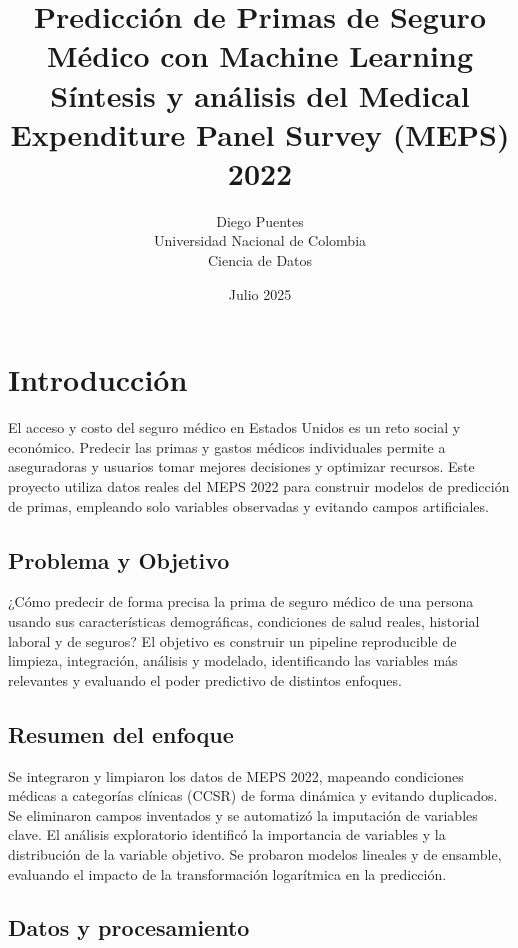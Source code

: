 \documentclass[12pt,a4paper]{article}
\title{
\textbf{Predicción de Primas de Seguro Médico con Machine Learning}\\
\large{Síntesis y análisis del Medical Expenditure Panel Survey (MEPS) 2022}
}
\author{
Diego Puentes\\
Universidad Nacional de Colombia\\
Ciencia de Datos
}
\date{Julio 2025}
\begin{document}
\maketitle

\newpage

\tableofcontents

\newpage

\section{Introducción}

El acceso y costo del seguro médico en Estados Unidos es un reto social y económico. Predecir las primas y gastos médicos individuales permite a aseguradoras y usuarios tomar mejores decisiones y optimizar recursos. Este proyecto utiliza datos reales del MEPS 2022 para construir modelos de predicción de primas, empleando solo variables observadas y evitando campos artificiales.

\subsection{Problema y Objetivo}

¿Cómo predecir de forma precisa la prima de seguro médico de una persona usando sus características demográficas, condiciones de salud reales, historial laboral y de seguros? El objetivo es construir un pipeline reproducible de limpieza, integración, análisis y modelado, identificando las variables más relevantes y evaluando el poder predictivo de distintos enfoques.

\subsection{Resumen del enfoque}

Se integraron y limpiaron los datos de MEPS 2022, mapeando condiciones médicas a categorías clínicas (CCSR) de forma dinámica y evitando duplicados. Se eliminaron campos inventados y se automatizó la imputación de variables clave. El análisis exploratorio identificó la importancia de variables y la distribución de la variable objetivo. Se probaron modelos lineales y de ensamble, evaluando el impacto de la transformación logarítmica en la predicción.

\subsection{Datos y procesamiento}
\end{document}
